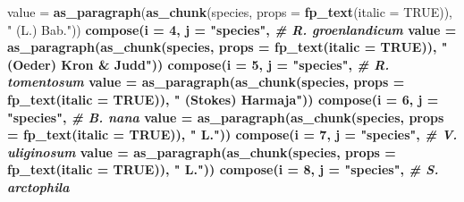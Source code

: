 \documentclass[
]{article}
\newenvironment{Shaded}{\begin{snugshade}}{\end{snugshade}}
\newcommand{\CommentTok}[1]{\textcolor[rgb]{0.56,0.35,0.01}{\textit{#1}}}
\newcommand{\DataTypeTok}[1]{\textcolor[rgb]{0.13,0.29,0.53}{#1}}
\newcommand{\DecValTok}[1]{\textcolor[rgb]{0.00,0.00,0.81}{#1}}
\newcommand{\KeywordTok}[1]{\textcolor[rgb]{0.13,0.29,0.53}{\textbf{#1}}}
\newcommand{\NormalTok}[1]{#1}
\newcommand{\OperatorTok}[1]{\textcolor[rgb]{0.81,0.36,0.00}{\textbf{#1}}}
\newcommand{\OtherTok}[1]{\textcolor[rgb]{0.56,0.35,0.01}{#1}}
\newcommand{\StringTok}[1]{\textcolor[rgb]{0.31,0.60,0.02}{#1}}
\begin{document}
\begin{Shaded}
\begin{Highlighting}[]
{{{{{{{{{{{{{{{          \DataTypeTok{value =} \KeywordTok{as_paragraph}\NormalTok{(}\KeywordTok{as_chunk}\NormalTok{(species,}
                                        \DataTypeTok{props =} \KeywordTok{fp_text}\NormalTok{(}\DataTypeTok{italic =} \OtherTok{TRUE}\NormalTok{)),}
                               \StringTok{" (L.) Bab."}\NormalTok{)) }\OperatorTok{%>%}\StringTok{ }
\StringTok{  }\KeywordTok{compose}\NormalTok{(}\DataTypeTok{i =} \DecValTok{4}\NormalTok{, }\DataTypeTok{j =} \StringTok{"species"}\NormalTok{,   }\CommentTok{# R. groenlandicum}
          \DataTypeTok{value =} \KeywordTok{as_paragraph}\NormalTok{(}\KeywordTok{as_chunk}\NormalTok{(species,}
                                        \DataTypeTok{props =} \KeywordTok{fp_text}\NormalTok{(}\DataTypeTok{italic =} \OtherTok{TRUE}\NormalTok{)),}
                               \StringTok{" (Oeder) Kron & Judd"}\NormalTok{)) }\OperatorTok{%>%}\StringTok{ }
\StringTok{  }\KeywordTok{compose}\NormalTok{(}\DataTypeTok{i =} \DecValTok{5}\NormalTok{, }\DataTypeTok{j =} \StringTok{"species"}\NormalTok{,   }\CommentTok{# R. tomentosum}
          \DataTypeTok{value =} \KeywordTok{as_paragraph}\NormalTok{(}\KeywordTok{as_chunk}\NormalTok{(species,}
                                        \DataTypeTok{props =} \KeywordTok{fp_text}\NormalTok{(}\DataTypeTok{italic =} \OtherTok{TRUE}\NormalTok{)),}
                               \StringTok{" (Stokes) Harmaja"}\NormalTok{)) }\OperatorTok{%>%}\StringTok{ }
\StringTok{  }\KeywordTok{compose}\NormalTok{(}\DataTypeTok{i =} \DecValTok{6}\NormalTok{, }\DataTypeTok{j =} \StringTok{"species"}\NormalTok{,   }\CommentTok{# B. nana}
          \DataTypeTok{value =} \KeywordTok{as_paragraph}\NormalTok{(}\KeywordTok{as_chunk}\NormalTok{(species,}
                                        \DataTypeTok{props =} \KeywordTok{fp_text}\NormalTok{(}\DataTypeTok{italic =} \OtherTok{TRUE}\NormalTok{)),}
                               \StringTok{" L."}\NormalTok{)) }\OperatorTok{%>%}\StringTok{ }
\StringTok{  }\KeywordTok{compose}\NormalTok{(}\DataTypeTok{i =} \DecValTok{7}\NormalTok{, }\DataTypeTok{j =} \StringTok{"species"}\NormalTok{,   }\CommentTok{# V. uliginosum}
          \DataTypeTok{value =} \KeywordTok{as_paragraph}\NormalTok{(}\KeywordTok{as_chunk}\NormalTok{(species,}
                                        \DataTypeTok{props =} \KeywordTok{fp_text}\NormalTok{(}\DataTypeTok{italic =} \OtherTok{TRUE}\NormalTok{)),}
                               \StringTok{" L."}\NormalTok{)) }\OperatorTok{%>%}\StringTok{ }
\StringTok{  }\KeywordTok{compose}\NormalTok{(}\DataTypeTok{i =} \DecValTok{8}\NormalTok{, }\DataTypeTok{j =} \StringTok{"species"}\NormalTok{,   }\CommentTok{# S. arctophila}
}}}}}}}}}}}}}}}}}}}}
\end{Highlighting}
\end{Shaded}
\end{document}
